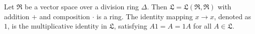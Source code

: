 Let $\mathfrak{R}$ be a vector space over a division ring $\Delta$. Then $\mathfrak{L} = \mathfrak{L}(\mathfrak{R}, \mathfrak{R})$ with addition $+$ and composition $\cdot$ is a ring. The identity mapping $x \to x$, denoted as $1$, is the multiplicative identity in $\mathfrak{L}$, satisfying $A1 = A = 1A$ for all $A \in \mathfrak{L}$.

